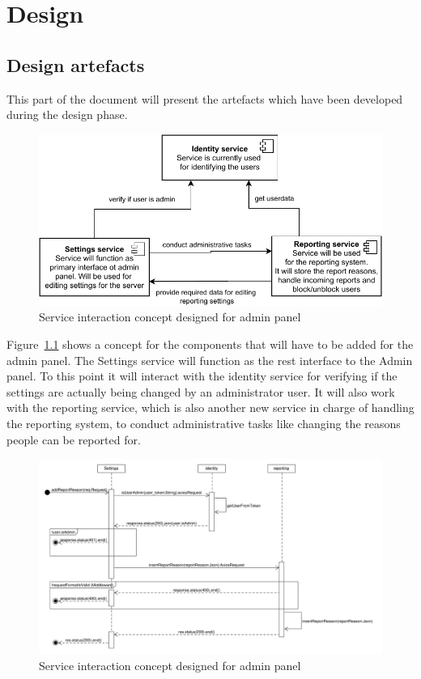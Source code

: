 

\chapter{Design}\label{ch:design}

\section{Design artefacts}\label{sec:design-artefacts}

This part of the document will present the artefacts which have been developed during the design phase.

\begin{figure}[h]
    \centering
    \includegraphics[width=1.0\textwidth]{./graphics/component_interaction}
    \caption{Service interaction concept designed for admin panel}
    \label{fig:componentInteraction}
\end{figure}

Figure~\ref{fig:componentInteraction} shows a concept for the components that will have to be added for the admin panel.
The Settings service will function as the rest interface to the Admin panel.
To this point it will interact with the identity service for verifying if the settings are actually being changed by an
administrator user.
It will also work with the reporting service, which is also another new service in charge of handling the reporting
system, to conduct administrative tasks like changing the reasons people can be reported for.

\begin{figure}[h]
    \centering
    \includegraphics[width=1.0\textwidth]{./graphics/SequenceDiagram_AddReportReason}
    \caption{Service interaction concept designed for admin panel}
    \label{fig:sequenceDiagramAddReportReason}
\end{figure}


